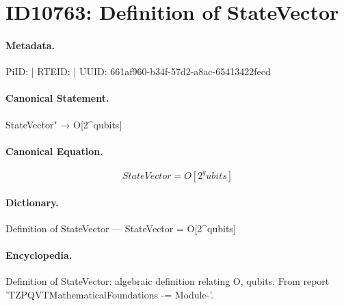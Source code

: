 \section*{ID10763: Definition of StateVector}
\paragraph{Metadata.}
PiID:  | RTEID:  | UUID: 661af960-b34f-57d2-a8ac-65413422fecd

\paragraph{Canonical Statement.}
StateVector" → O[2\textasciicircum{}qubits]

\paragraph{Canonical Equation.}
\[
StateVector = O[2^qubits]
\]

\paragraph{Dictionary.}
Definition of StateVector — StateVector = O[2\textasciicircum{}qubits]

\paragraph{Encyclopedia.}
Definition of StateVector: algebraic definition relating O, qubits. From report 'TZPQVTMathematicalFoundations -= Module-'.
